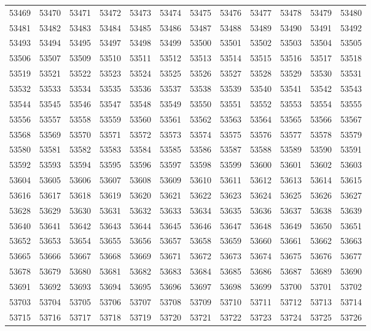 \begin{center}
\begin{longtable}{llllllllllll}
53469 &53470 &53471 &53472 &53473 &53474 &53475 &53476 &53477 &53478 &53479 &53480 \\
53481 &53482 &53483 &53484 &53485 &53486 &53487 &53488 &53489 &53490 &53491 &53492 \\
53493 &53494 &53495 &53497 &53498 &53499 &53500 &53501 &53502 &53503 &53504 &53505 \\
53506 &53507 &53509 &53510 &53511 &53512 &53513 &53514 &53515 &53516 &53517 &53518 \\
53519 &53521 &53522 &53523 &53524 &53525 &53526 &53527 &53528 &53529 &53530 &53531 \\
53532 &53533 &53534 &53535 &53536 &53537 &53538 &53539 &53540 &53541 &53542 &53543 \\
53544 &53545 &53546 &53547 &53548 &53549 &53550 &53551 &53552 &53553 &53554 &53555 \\
53556 &53557 &53558 &53559 &53560 &53561 &53562 &53563 &53564 &53565 &53566 &53567 \\
53568 &53569 &53570 &53571 &53572 &53573 &53574 &53575 &53576 &53577 &53578 &53579 \\
53580 &53581 &53582 &53583 &53584 &53585 &53586 &53587 &53588 &53589 &53590 &53591 \\
53592 &53593 &53594 &53595 &53596 &53597 &53598 &53599 &53600 &53601 &53602 &53603 \\
53604 &53605 &53606 &53607 &53608 &53609 &53610 &53611 &53612 &53613 &53614 &53615 \\
53616 &53617 &53618 &53619 &53620 &53621 &53622 &53623 &53624 &53625 &53626 &53627 \\
53628 &53629 &53630 &53631 &53632 &53633 &53634 &53635 &53636 &53637 &53638 &53639 \\
53640 &53641 &53642 &53643 &53644 &53645 &53646 &53647 &53648 &53649 &53650 &53651 \\
53652 &53653 &53654 &53655 &53656 &53657 &53658 &53659 &53660 &53661 &53662 &53663 \\
53665 &53666 &53667 &53668 &53669 &53671 &53672 &53673 &53674 &53675 &53676 &53677 \\
53678 &53679 &53680 &53681 &53682 &53683 &53684 &53685 &53686 &53687 &53689 &53690 \\
53691 &53692 &53693 &53694 &53695 &53696 &53697 &53698 &53699 &53700 &53701 &53702 \\
53703 &53704 &53705 &53706 &53707 &53708 &53709 &53710 &53711 &53712 &53713 &53714 \\
53715 &53716 &53717 &53718 &53719 &53720 &53721 &53722 &53723 &53724 &53725 &53726 \\

\end{longtable}
\end{center}
